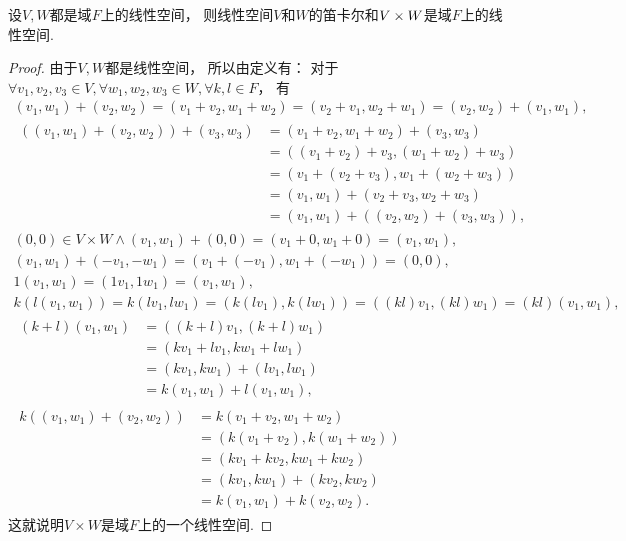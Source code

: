 \begin{theorem}\label{theorem:线性空间.线性空间的笛卡尔和是线性空间}
设\(V,W\)都是域\(F\)上的线性空间，
则线性空间\(V\)和\(W\)的笛卡尔和\(V \times W\)是域\(F\)上的线性空间.
\begin{proof}
由于\(V,W\)都是线性空间，
所以由定义有：
对于\(\forall v_1,v_2,v_3 \in V,
\forall w_1,w_2,w_3 \in W,
\forall k,l \in F\)，
有\begin{gather*}
	(v_1,w_1) + (v_2,w_2)
	= (v_1+v_2,w_1+w_2)
	= (v_2+v_1,w_2+w_1)
	= (v_2,w_2)+(v_1,w_1), \\
	\begin{aligned}
		((v_1,w_1) + (v_2,w_2)) + (v_3,w_3)
		&= (v_1+v_2,w_1+w_2) + (v_3,w_3) \\
		&= ((v_1+v_2)+v_3,(w_1+w_2)+w_3) \\
		&= (v_1+(v_2+v_3),w_1+(w_2+w_3)) \\
		&= (v_1,w_1) + (v_2+v_3,w_2+w_3) \\
		&= (v_1,w_1) + ((v_2,w_2) + (v_3,w_3)),
	\end{aligned} \\
	(0,0) \in V \times W
	\land
	(v_1,w_1) + (0,0)
	= (v_1+0,w_1+0)
	= (v_1,w_1), \\
	(v_1,w_1) + (-v_1,-w_1)
	= (v_1+(-v_1),w_1+(-w_1))
	= (0,0), \\
	1(v_1,w_1)
	= (1v_1,1w_1)
	= (v_1,w_1), \\
	k(l(v_1,w_1))
	= k(lv_1,lw_1)
	= (k(lv_1),k(lw_1))
	= ((kl)v_1,(kl)w_1)
	= (kl)(v_1,w_1), \\
	\begin{aligned}
		(k+l)(v_1,w_1)
		&= ((k+l)v_1,(k+l)w_1) \\
		&= (kv_1+lv_1,kw_1+lw_1) \\
		&= (kv_1,kw_1) + (lv_1,lw_1) \\
		&= k(v_1,w_1) + l(v_1,w_1),
	\end{aligned} \\
	\begin{aligned}
		k((v_1,w_1)+(v_2,w_2))
		&= k(v_1+v_2,w_1+w_2) \\
		&= (k(v_1+v_2),k(w_1+w_2)) \\
		&= (kv_1+kv_2,kw_1+kw_2) \\
		&= (kv_1,kw_1)+(kv_2,kw_2) \\
		&= k(v_1,w_1)+k(v_2,w_2).
	\end{aligned}
\end{gather*}
这就说明\(V \times W\)是域\(F\)上的一个线性空间.
\end{proof}
\end{theorem}

